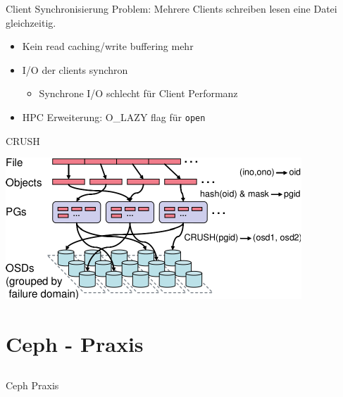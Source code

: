 \documentclass[notes=hide,yellow]{beamer}
\begin{document}
\begin{frame}{Client Synchronisierung}
	Problem: Mehrere Clients schreiben lesen eine Datei gleichzeitig.

	\begin{itemize}	
		\item Kein read caching/write buffering mehr
		\item I/O der clients synchron %
			\begin{itemize}
				\item Synchrone I/O schlecht f\"ur Client Performanz
			\end{itemize}
		\item HPC Erweiterung: O\_LAZY flag f\"ur \texttt{open}
	\end{itemize}
\end{frame}


\begin{frame}{CRUSH}
	\begin{center}
	\includegraphics{crush.pdf}
\end{center}
\end{frame}

\section{Ceph - Praxis}
\subsection*{}

\begin{frame}
	\begin{center}
	\Large{Ceph Praxis}
	\end{center}
\end{frame}
\end{document}
